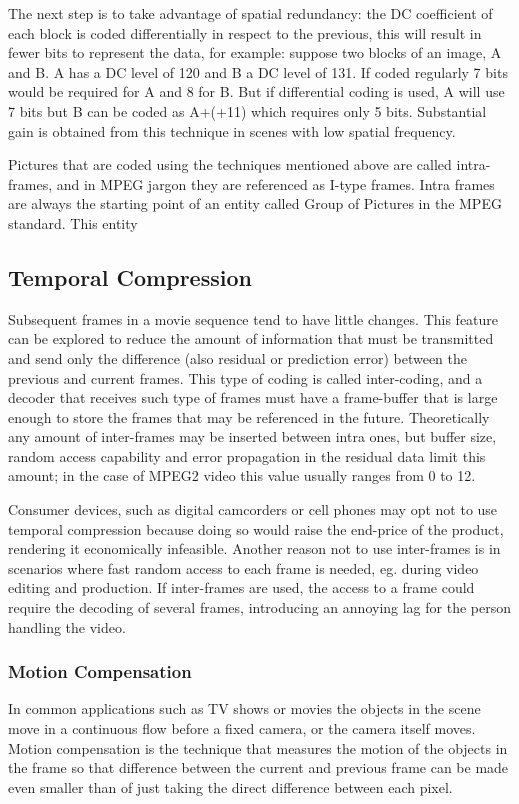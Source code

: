 \documentclass[a4paper, 12pt]{article}
\begin{document}
	The next step is to take advantage of spatial redundancy: the DC coefficient of each block is coded differentially in respect to the previous, this will result in fewer bits to represent the data, for example: suppose two blocks of an image, A and B. A has a DC level of 120 and B a DC level of 131. If coded regularly 7 bits would be required for A and 8 for B. But if differential coding is used, A will use 7 bits but B can be coded as A+(+11) which requires only 5 bits. Substantial gain is obtained from this technique in scenes with low spatial frequency.

	Pictures that are coded using the techniques mentioned above are called intra-frames, and in MPEG jargon they are referenced as I-type frames. Intra frames are always the starting point of an entity called Group of Pictures in the MPEG standard. This entity 

\subsection{Temporal Compression}
	Subsequent frames in a movie sequence tend to have little changes.  This feature can be explored to reduce the amount of information that must be transmitted and send only the difference (also residual or prediction error) between the previous and current frames. This type of coding is called inter-coding, and a decoder that receives such type of frames must have a frame-buffer that is large enough to store the frames that may be referenced in the future. Theoretically any amount of inter-frames may be inserted between intra ones, but buffer size, random access capability and error propagation in the residual data limit this amount; in the case of MPEG2 video this value usually ranges from 0 to 12.
	
	Consumer devices, such as digital camcorders or cell phones may opt not to use temporal compression because doing so would raise the end-price of the product, rendering it economically infeasible. Another reason not to use inter-frames is in scenarios where fast random access to each frame is needed, eg. during video editing and production. If inter-frames are used, the access to a frame could require the decoding of several frames, introducing an annoying lag for the person handling the video.

\subsubsection{Motion Compensation}
	In common applications such as TV shows or movies the objects in the scene move in a continuous flow before a fixed camera, or the camera itself moves. Motion compensation is the technique that measures the motion of the objects in the frame so that difference between the current and previous frame can be made even smaller than of just taking the direct difference between each pixel. 
\end{document}

